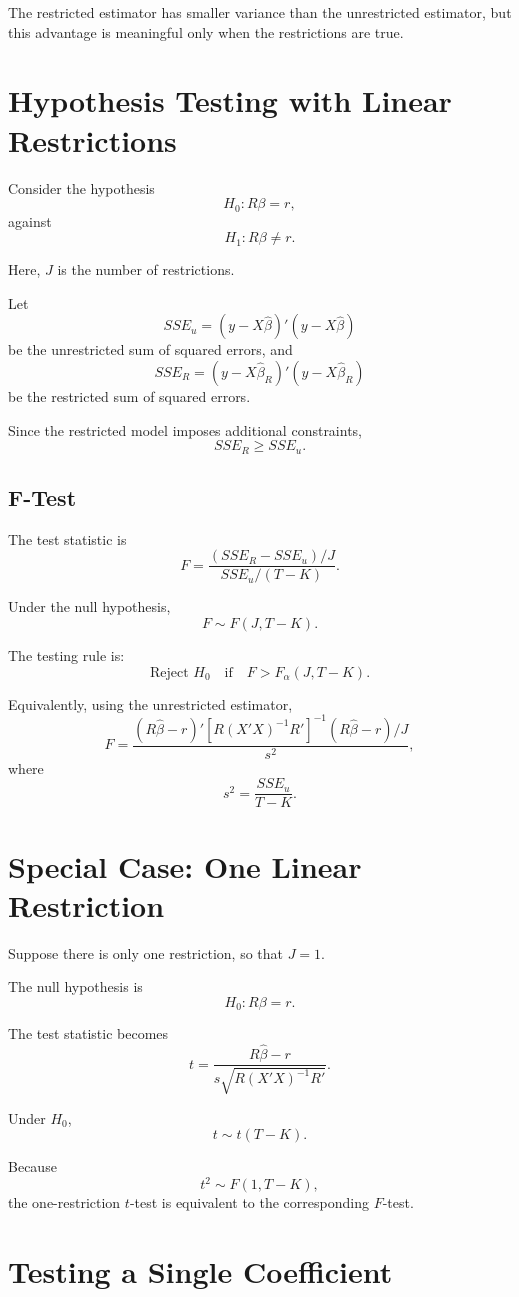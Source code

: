 The restricted estimator has smaller variance than the unrestricted estimator, but this advantage is meaningful only when the restrictions are true.

\section{Hypothesis Testing with Linear Restrictions}

Consider the hypothesis
\[
H_0: R\beta = r,
\]
against
\[
H_1: R\beta \neq r.
\]

Here, $J$ is the number of restrictions.

Let
\[
SSE_u = (y-X\hat{\beta})'(y-X\hat{\beta})
\]
be the unrestricted sum of squared errors, and
\[
SSE_R = (y-X\hat{\beta}_R)'(y-X\hat{\beta}_R)
\]
be the restricted sum of squared errors.

Since the restricted model imposes additional constraints,
\[
SSE_R \geq SSE_u.
\]

\subsection{F-Test}

The test statistic is
\[
F
=
\frac{(SSE_R-SSE_u)/J}{SSE_u/(T-K)}.
\]

Under the null hypothesis,
\[
F \sim F(J,T-K).
\]

The testing rule is:
\[
\text{Reject } H_0
\quad \text{if} \quad
F > F_{\alpha}(J,T-K).
\]

Equivalently, using the unrestricted estimator,
\[
F
=
\frac{
(R\hat{\beta}-r)'
\left[R(X'X)^{-1}R'\right]^{-1}
(R\hat{\beta}-r)/J
}{
s^2
},
\]
where
\[
s^2 = \frac{SSE_u}{T-K}.
\]

\section{Special Case: One Linear Restriction}

Suppose there is only one restriction, so that $J=1$.

The null hypothesis is
\[
H_0: R\beta = r.
\]

The test statistic becomes
\[
t
=
\frac{R\hat{\beta}-r}
{
s\sqrt{R(X'X)^{-1}R'}
}.
\]

Under $H_0$,
\[
t \sim t(T-K).
\]

Because
\[
t^2 \sim F(1,T-K),
\]
the one-restriction $t$-test is equivalent to the corresponding $F$-test.

\section{Testing a Single Coefficient}

